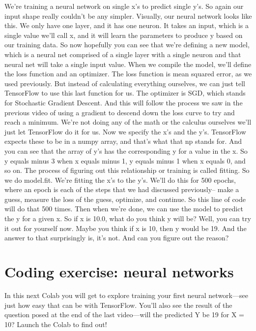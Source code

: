 We're training a neural network on single x's to predict single y's.
So again our input shape really couldn't be any simpler.
Visually, our neural network looks like this.
We only have one layer, and it has one neuron.
It takes an input, which is a single value we'll call x,
and it will learn the parameters to produce y based on our training data.
So now hopefully you can see that we're defining a new model, which
is a neural net comprised of a single layer with a single neuron
and that neural net will take a single input value.
When we compile the model, we'll define the loss function and an optimizer.
The loss function is mean squared error, as we used previously.
But instead of calculating everything ourselves,
we can just tell TensorFlow to use this last function for us.
The optimizer is SGD, which stands for Stochastic Gradient Descent.
And this will follow the process we saw in the previous video of using
a gradient to descend down the loss curve to try and reach a minimum.
We're not doing any of the math or the calculus ourselves
we'll just let TensorFlow do it for us.
Now we specify the x's and the y's.
TensorFlow expects these to be in a numpy array,
and that's what that np stands for.
And you can see that the array of y's has the corresponding y
for a value in the x.
So y equals minus 3 when x equals minus 1, y equals minus 1 when x equals 0,
and so on.
The process of figuring out this relationship or training
is called fitting.
So we do model.fit.
We're fitting the x's to the y's.
We'll do this for 500 epochs, where an epoch is each of the steps
that we had discussed previously-- make a guess, measure the loss of the guess,
optimize, and continue.
So this line of code will do that 500 times.
Then when we're done, we can use the model to predict the y for a given x.
So if x is 10.0, what do you think y will be?
Well, you can try it out for yourself now.
Maybe you think if x is 10, then y would be 19.
And the answer to that surprisingly is, it's not.
And can you figure out the reason?

\section{Coding exercise: neural networks}

In this next Colab you will get to explore training your first neural network—see just how easy that can be with TensorFlow. You’ll also see the result of the question posed at the end of the last video—will the predicted Y be 19 for X = 10? Launch the Colab to find out!

